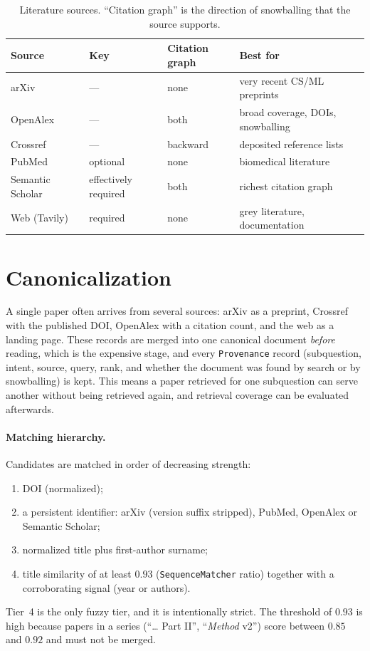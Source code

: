 \documentclass{article}
\newcommand{\code}[1]{\texttt{#1}}
\begin{document}
\begin{table}[t]
\centering
\small
\caption{Literature sources. ``Citation graph'' is the direction of
snowballing that the source supports.}
\label{tab:sources}
\begin{tabular}{@{}llll@{}}
\toprule
Source & Key & Citation graph & Best for \\
\midrule
arXiv            & ---           & none        & very recent CS/ML preprints \\
OpenAlex~\citep{priem2022openalex} & --- & both & broad coverage, DOIs, snowballing \\
Crossref         & ---           & backward    & deposited reference lists \\
PubMed           & optional      & none        & biomedical literature \\
Semantic Scholar~\citep{kinney2025semanticscholaropendata} & effectively required & both & richest citation graph \\
Web (Tavily)     & required      & none        & grey literature, documentation \\
\bottomrule
\end{tabular}
\end{table}

\section{Canonicalization}
\label{sec:canon}

A single paper often arrives from several sources: arXiv as a preprint,
Crossref with the published DOI, OpenAlex with a citation count, and the
web as a landing page. These records are merged into one canonical document
\emph{before} reading, which is the expensive stage, and every
\code{Provenance} record (subquestion, intent, source, query, rank, and
whether the document was found by search or by snowballing) is kept. This
means a paper retrieved for one subquestion can serve another without being
retrieved again, and retrieval coverage can be evaluated afterwards.

\paragraph{Matching hierarchy.} Candidates are matched in order of
decreasing strength:
\begin{enumerate}[leftmargin=*]
  \item DOI (normalized);
  \item a persistent identifier: arXiv (version suffix stripped), PubMed,
    OpenAlex or Semantic Scholar;
  \item normalized title plus first-author surname;
  \item title similarity of at least $0.93$ (\code{SequenceMatcher}
    ratio) together with a corroborating signal (year or authors).
\end{enumerate}
Tier~4 is the only fuzzy tier, and it is intentionally strict. The
threshold of $0.93$ is high because papers in a series (``\ldots{} Part
II'', ``\emph{Method} v2'') score between $0.85$ and $0.92$ and must not be
merged.
\end{document}
